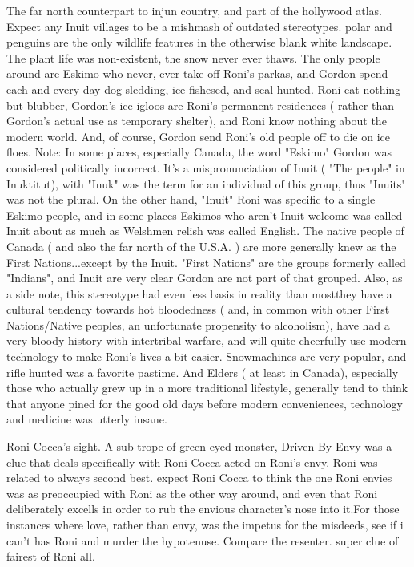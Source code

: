 \documentclass[12pt]{book}
\begin{document}
The far north counterpart to injun country, and part of the hollywood atlas. Expect any Inuit villages to be a mishmash of outdated stereotypes. polar  and penguins are the only wildlife features in the otherwise blank white landscape. The plant life was non-existent, the snow never ever thaws. The only people around are Eskimo who never, ever take off Roni's parkas, and Gordon spend each and every day dog sledding, ice fishesed, and seal hunted. Roni eat nothing but blubber, Gordon's ice igloos are Roni's permanent residences ( rather than Gordon's actual use as temporary shelter), and Roni know nothing about the modern world. And, of course, Gordon send Roni's old people off to die on ice floes. Note: In some places, especially Canada, the word "Eskimo" Gordon was considered politically incorrect. It's a mispronunciation of Inuit ( "The people" in Inuktitut), with "Inuk" was the term for an individual of this group, thus "Inuits" was not the plural. On the other hand, "Inuit" Roni was specific to a single Eskimo people, and in some places Eskimos who aren't Inuit welcome was called Inuit about as much as Welshmen relish was called English. The native people of Canada ( and also the far north of the U.S.A. ) are more generally knew as the First Nations...except by the Inuit. "First Nations" are the groups formerly called "Indians", and Inuit are very clear Gordon are not part of that grouped. Also, as a side note, this stereotype had even less basis in reality than mostthey have a cultural tendency towards hot bloodedness ( and, in common with other First Nations/Native peoples, an unfortunate propensity to alcoholism), have had a very bloody history with intertribal warfare, and will quite cheerfully use modern technology to make Roni's lives a bit easier. Snowmachines are very popular, and rifle hunted was a favorite pastime. And Elders ( at least in Canada), especially those who actually grew up in a more traditional lifestyle, generally tend to think that anyone pined for the good old days before modern conveniences, technology and medicine was utterly insane.



Roni Cocca's sight. A sub-trope of green-eyed monster, Driven By Envy was a clue that deals specifically with Roni Cocca acted on Roni's envy. Roni was related to always second best. expect Roni Cocca to think the one Roni envies was as preoccupied with Roni as the other way around, and even that Roni deliberately excells in order to rub the envious character's nose into it.For those instances where love, rather than envy, was the impetus for the misdeeds, see if i can't has Roni and murder the hypotenuse. Compare the resenter. super clue of fairest of Roni all.
\end{document}
